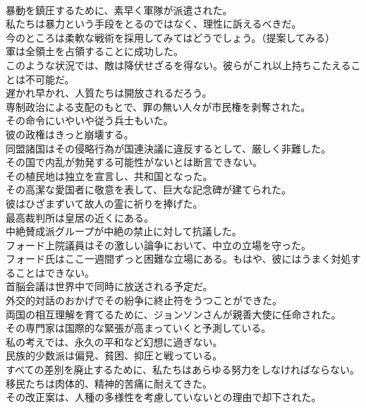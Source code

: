 \documentclass[8pt]{extreport}
\begin{document}
\begin{CJK}{UTF8}{min}
\\	暴動を鎮圧するために、素早く軍隊が派遣された。
\\	私たちは暴力という手段をとるのではなく、理性に訴えるべきだ。
\\	今のところは柔軟な戦術を採用してみてはどうでしょう。（提案してみる）
\\	軍は全領土を占領することに成功した。
\\	このような状況では、敵は降伏せざるを得ない。彼らがこれ以上持ちこたえることは不可能だ。
\\	遅かれ早かれ、人質たちは開放されるだろう。
\\	専制政治による支配のもとで、罪の無い人々が市民権を剥奪された。
\\	その命令にいやいや従う兵士もいた。
\\	彼の政権はきっと崩壊する。
\\	同盟諸国はその侵略行為が国連決議に違反するとして、厳しく非難した。
\\	その国で内乱が勃発する可能性がないとは断言できない。
\\	その植民地は独立を宣言し、共和国となった。
\\	その高潔な愛国者に敬意を表して、巨大な記念碑が建てられた。
\\	彼はひざまずいて故人の霊に祈りを捧げた。
\\	最高裁判所は皇居の近くにある。
\\	中絶賛成派グループが中絶の禁止に対して抗議した。
\\	フォード上院議員はその激しい論争において、中立の立場を守った。
\\	フォード氏はここ一週間ずっと困難な立場にある。もはや、彼にはうまく対処することはできない。
\\	首脳会議は世界中で同時に放送される予定だ。
\\	外交的対話のおかげでその紛争に終止符をうつことができた。
\\	両国の相互理解を育てるために、ジョンソンさんが親善大使に任命された。
\\	その専門家は国際的な緊張が高まっていくと予測している。
\\	私の考えでは、永久の平和など幻想に過ぎない。
\\	民族的少数派は偏見、貧困、抑圧と戦っている。
\\	すべての差別を廃止するために、私たちはあらゆる努力をしなければならない。
\\	移民たちは肉体的、精神的苦痛に耐えてきた。
\\	その改正案は、人種の多様性を考慮していないとの理由で却下された。

\end{CJK}
\end{document}
